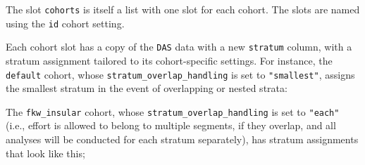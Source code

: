 \documentclass[
]{book}
\newenvironment{Shaded}{\begin{snugshade}}{\end{snugshade}}
\newcommand{\DataTypeTok}[1]{\textcolor[rgb]{0.13,0.29,0.53}{#1}}
\newcommand{\DecValTok}[1]{\textcolor[rgb]{0.00,0.00,0.81}{#1}}
\newcommand{\KeywordTok}[1]{\textcolor[rgb]{0.13,0.29,0.53}{\textbf{#1}}}
\newcommand{\NormalTok}[1]{#1}
\newcommand{\OperatorTok}[1]{\textcolor[rgb]{0.81,0.36,0.00}{\textbf{#1}}}
\newcommand{\StringTok}[1]{\textcolor[rgb]{0.31,0.60,0.02}{#1}}
\begin{document}
\begin{Shaded}
\end{Shaded}

The slot \texttt{cohorts} is itself a list with one slot for each cohort. The slots are named using the \texttt{id} cohort setting.

\begin{Shaded}
\end{Shaded}

Each cohort slot has a copy of the \texttt{DAS} data with a new \texttt{stratum} column, with a stratum assignment tailored to its cohort-specific settings. For instance, the \texttt{default} cohort, whose \texttt{stratum\_overlap\_handling} is set to \texttt{"smallest"}, assigns the smallest stratum in the event of overlapping or nested strata:

\begin{Shaded}
\end{Shaded}

The \texttt{fkw\_insular} cohort, whose \texttt{stratum\_overlap\_handling} is set to \texttt{"each"} (i.e., effort is allowed to belong to multiple segments, if they overlap, and all analyses will be conducted for each stratum separately), has stratum assignments that look like this;

\begin{Shaded}
\end{Shaded}
\end{document}
